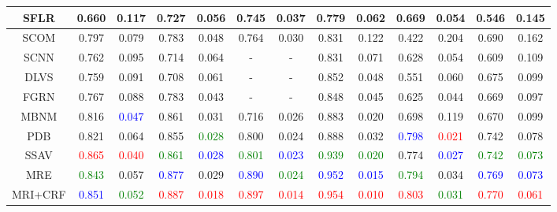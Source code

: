 \begin{table}[]
\begin{tabular}{|c|c|c|c|c|c|c|c|c|c|c|c|c|}
SFLR & 0.660 & 0.117 & 0.727 & 0.056 & 0.745 & 0.037 & 0.779 & 0.062 & 0.669 & 0.054 & 0.546 & 0.145 \\ \hline
SCOM & 0.797 & 0.079 & 0.783 & 0.048 & 0.764 & 0.030 & 0.831 & 0.122 & 0.422 & 0.204 & 0.690 & 0.162 \\ \hline
SCNN & 0.762 & 0.095 & 0.714 & 0.064 & - & - & 0.831 & 0.071 & 0.628 & 0.054 & 0.609 & 0.109 \\ \hline
DLVS & 0.759 & 0.091 & 0.708 & 0.061 & - & - & 0.852 & 0.048 & 0.551 & 0.060 & 0.675 & 0.099 \\ \hline
FGRN & 0.767 & 0.088 & 0.783 & 0.043 & - & - & 0.848 & 0.045 & 0.625 & 0.044 & 0.669 & 0.097 \\ \hline
MBNM & 0.816 & \textcolor{blue}{0.047} & 0.861 & 0.031 & 0.716 & 0.026 & 0.883 & 0.020 & 0.698 & 0.119 & 0.670 & 0.099 \\ \hline
PDB & 0.821 & 0.064 & 0.855 & \textcolor{green}{0.028} & 0.800 & 0.024 & 0.888 & 0.032 & \textcolor{blue}{0.798} & \textcolor{red}{0.021} & 0.742 & 0.078 \\ \hline
SSAV & \textcolor{red}{0.865} & \textcolor{red}{0.040} & \textcolor{green}{0.861} & \textcolor{blue}{0.028} & \textcolor{green}{0.801} & \textcolor{blue}{0.023} & \textcolor{green}{0.939} & \textcolor{green}{0.020} & 0.774 & \textcolor{blue}{0.027} & \textcolor{green}{0.742} & \textcolor{green}{0.073} \\ \hline \hline
MRE & \textcolor{green}{0.843} & 0.057 & \textcolor{blue}{0.877} & 0.029 & \textcolor{blue}{0.890} & \textcolor{green}{0.024} & \textcolor{blue}{0.952} & \textcolor{blue}{0.015} & \textcolor{green}{0.794} & 0.034 & \textcolor{blue}{0.769} & \textcolor{blue}{0.073} \\ \hline
MRI+CRF & \textcolor{blue}{0.851} & \textcolor{green}{0.052} & \textcolor{red}{0.887} & \textcolor{red}{0.018} & \textcolor{red}{0.897} & \textcolor{red}{0.014} & \textcolor{red}{0.954} & \textcolor{red}{0.010} & \textcolor{red}{0.803} & \textcolor{green}{0.031} & \textcolor{red}{0.770} & \textcolor{red}{0.061} \\ \hline
\end{tabular}
\end{table}
